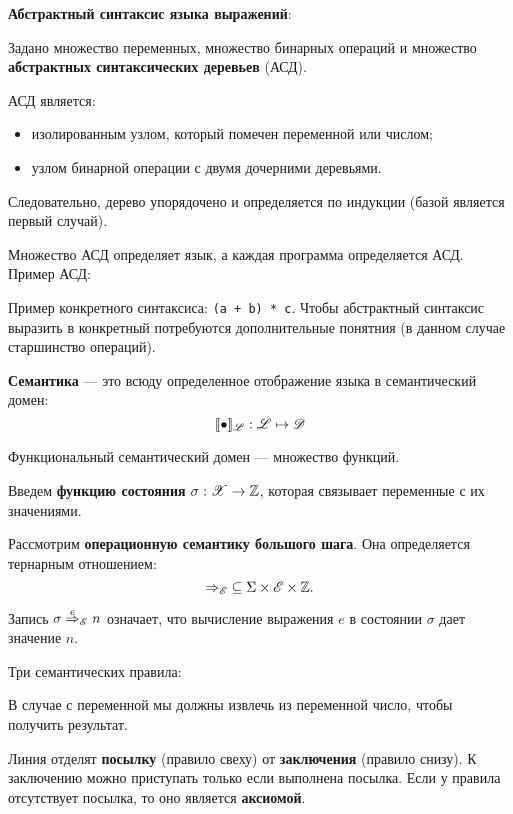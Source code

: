 \textbf{Абстрактный синтаксис языка выражений}:


Задано множество переменных, множество бинарных операций и множество
\textbf{абстрактных синтаксических деревьев} (АСД).

АСД является:

\begin{itemize}
    \item изолированным узлом, который помечен переменной или числом;

    \item узлом бинарной операции с двумя дочерними деревьями.
\end{itemize}

Следовательно, дерево упорядочено и определяется по индукции (базой является
первый случай).


Множество АСД определяет язык, а каждая программа определяется АСД. Пример АСД:


Пример конкретного синтаксиса: \texttt{(a + b) * c}. Чтобы абстрактный
синтаксис выразить в конкретный потребуются дополнительные понятния (в данном
случае старшинство операций).

\textbf{Семантика} --- это всюду определенное отображение языка в семантический
домен:
\[
    \llbracket \bullet \rrbracket_{\mathscr{L}} : \mathscr{L} \mapsto \mathscr{D}
\]

Функциональный семантический домен --- множество функций.

Введем \textbf{функцию состояния} $\sigma : \mathscr{X} \to \mathbb{Z}$, которая
связывает переменные с их значениями.

Рассмотрим \textbf{операционную семантику большого шага}. Она определяется тернарным
отношением:
\[
    \neatarrow_\Lexpr\; \subseteq \Sigma \times \Lexpr \times \mathbb{Z}.
\]

Запись $\sigma \overset{e}{\neatarrow}_\Lexpr n$ означает, что вычисление
выражения $e$ в состоянии $\sigma$ дает значение $n$.

Три семантических правила:


В случае с переменной мы должны извлечь из переменной число, чтобы получить
результат.

Линия отделят \textbf{посылку} (правило свеху) от \textbf{заключения} (правило снизу). К заключению можно
приступать только если выполнена посылка. Если у правила отсутствует посылка,
то оно является \textbf{аксиомой}. 

